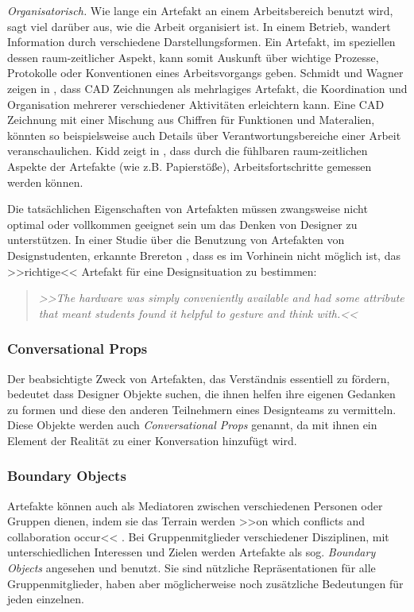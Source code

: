 \medskip \emph{Organisatorisch.} Wie lange ein Artefakt an einem Arbeitsbereich benutzt wird, sagt viel darüber aus, wie die Arbeit organisiert ist. In einem Betrieb, wandert Information durch verschiedene Darstellungsformen. Ein Artefakt, im speziellen dessen raum-zeitlicher Aspekt, kann somit Auskunft über wichtige Prozesse, Protokolle oder Konventionen eines Arbeitsvorgangs geben. Schmidt und Wagner zeigen in \citep{Schmidt:2002}, dass \ac{CAD} Zeichnungen als mehrlagiges Artefakt, die Koordination und Organisation mehrerer verschiedener Aktivitäten erleichtern kann. Eine \ac{CAD} Zeichnung mit einer Mischung aus Chiffren für Funktionen und Materalien, könnten so beispielsweise auch Details über Verantwortungsbereiche einer Arbeit veranschaulichen. Kidd zeigt in \citep{Kidd:1994}, dass durch die fühlbaren raum-zeitlichen Aspekte der Artefakte (wie z.B. Papierstöße), Arbeitsfortschritte gemessen werden können. \citep{Vyas:2008}

\bigskip Die tatsächlichen Eigenschaften von Artefakten müssen zwangsweise nicht optimal oder vollkommen geeignet sein um das Denken von Designer zu unterstützen. In einer Studie über die Benutzung von Artefakten von Designstudenten, erkannte Brereton \citep{Brereton:2000}, dass es im Vorhinein nicht möglich ist, das >>richtige<< Artefakt für eine Designsituation zu bestimmen:

\begin{quote}
	\textsl{>>The hardware was simply conveniently available and had some attribute that meant students found it helpful to gesture and think with.<<}
\begin{flushright}\citep{Brereton:2000}\end{flushright}
\end{quote}

\subsubsection{Conversational Props}
Der beabsichtigte Zweck von Artefakten, das Verständnis essentiell zu fördern, bedeutet dass Designer Objekte suchen, die ihnen helfen ihre eigenen Gedanken zu formen und diese den anderen Teilnehmern eines Designteams zu vermitteln. Diese Objekte werden auch \emph{Conversational Props} \citep{Brinck:1992} genannt, da mit ihnen ein Element der Realität zu einer Konversation hinzufügt wird. \citep{Larsson:2003}

\subsubsection{Boundary Objects}
Artefakte können auch als Mediatoren zwischen verschiedenen Personen oder Gruppen dienen, indem sie das Terrain werden >>on which conflicts and collaboration occur<< \citep{Perry:1998}. Bei Gruppenmitglieder verschiedener Disziplinen, mit unterschiedlichen Interessen und Zielen werden Artefakte als sog. \emph{Boundary Objects} \citep{Star:1989} angesehen und benutzt. Sie sind nützliche Repräsentationen für alle Gruppenmitglieder, haben aber möglicherweise noch zusätzliche Bedeutungen für jeden einzelnen. \citep{Larsson:2003}

